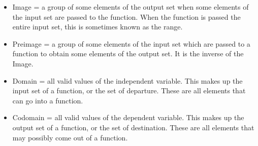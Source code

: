 \documentclass{scrreprt}
\begin{document}
\begin{itemize}
	\item Image = a group of some elements of the output set when some elements of the input set are passed to the function. When the function is passed the entire input set, this is sometimes known as the range.
	\item Preimage = a group of some elements of the input set which are passed to a function to obtain some elements of the output set. It is the inverse of the Image.
	\item Domain = all valid values of the independent variable. This makes up the input set of a function, or the set of departure. These are all elements that can go into a function.  
	\item Codomain = all valid values of the dependent variable. This makes up the output set of a function, or the set of destination. These are all elements that may possibly come out of a function.
\end{itemize}
\end{document}
